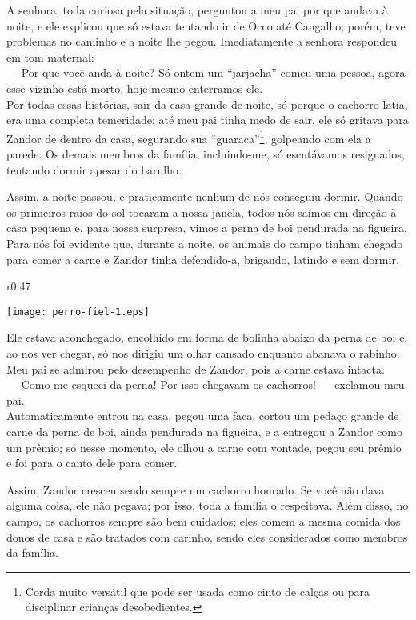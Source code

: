 A senhora, toda curiosa pela situação, perguntou a meu pai por que andava à noite, e ele explicou que só estava tentando ir de Occo até Cangalho; porém, teve problemas no caminho e a noite lhe pegou. 
Imediatamente a senhora respondeu em tom maternal:\\\indent 
--- Por que você anda à noite? Só ontem um ``jarjacha'' comeu uma pessoa, agora esse vizinho está morto, hoje mesmo enterramos ele.\\\indent
Por todas essas histórias, sair da casa grande de noite, só porque o cachorro latia, era uma completa temeridade; até meu pai tinha medo de sair, ele só gritava para Zandor de dentro da casa, segurando sua ``guaraca''\footnote{Corda muito versátil que pode ser usada como cinto de calças ou para disciplinar crianças desobedientes.}, golpeando com ela a parede. 
Os demais membros da família, incluindo-me, só escutávamos resignados, tentando dormir apesar do barulho.

Assim, a noite passou, e praticamente nenhum de nós conseguiu dormir. 
Quando os primeiros raios do sol tocaram a nossa janela, todos nós saímos em direção à casa pequena e, para nossa surpresa, vimos a perna de boi pendurada na figueira. 
Para nós foi evidente que, durante a noite, os animais do campo tinham chegado para comer a carne e Zandor tinha defendido-a, brigando, latindo e sem dormir.
\ifdefined\EnableIncludeImages 
\begin{wrapfigure}{r}{0.47\textwidth}
  \begin{center}
  \vspace{-0.5cm}
    \texttt{[image: perro-fiel-1.eps]}
  \end{center}
  \vspace{-0.5cm}
\end{wrapfigure}
\fi
Ele estava aconchegado, encolhido em forma de bolinha abaixo da perna de boi e, ao nos ver chegar, só nos dirigiu um olhar cansado enquanto abanava o rabinho. Meu pai se admirou pelo desempenho de Zandor, pois a carne estava intacta.\\\indent
--- Como me esqueci da perna! Por isso chegavam os cachorros! --- exclamou meu pai.\\\indent
Automaticamente entrou na casa, pegou uma faca, cortou um pedaço grande de carne da perna de boi, ainda pendurada na figueira, e a entregou a Zandor como um prêmio; só nesse momento, ele olhou a carne com vontade, pegou seu prêmio e foi para o canto dele para comer.

Assim, Zandor cresceu sendo sempre um cachorro honrado. Se você não dava alguma coisa, ele não pegava; por isso, toda a família o respeitava. Além disso, no campo, os cachorros sempre são bem cuidados; eles comem a mesma comida dos donos de casa e são tratados com carinho, sendo eles considerados como membros da família.

